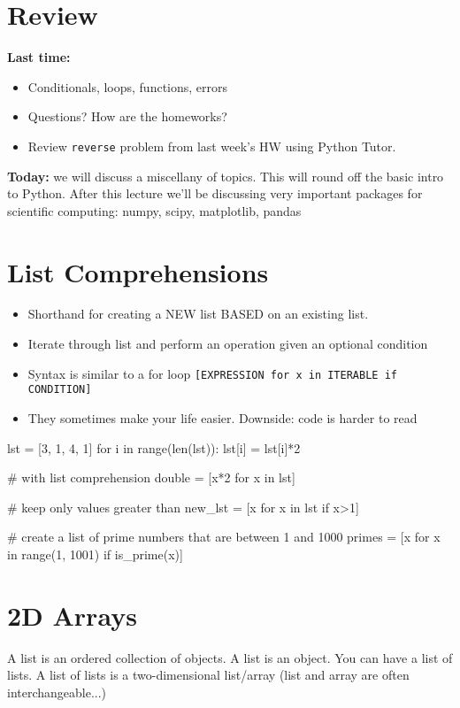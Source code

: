 \documentclass[12pt]{article}
\numberwithin{equation}{section}
\begin{document}
	

\section{Review}

\textbf{Last time:}
\begin{itemize}
    \item Conditionals, loops, functions, errors
    \item Questions? How are the homeworks?
    \item Review \verb|reverse| problem from last week's HW using Python Tutor.
\end{itemize}

\textbf{Today:} we will discuss a miscellany of topics. This will round off the basic intro to Python. After this lecture we'll be discussing very important packages for scientific computing: numpy, scipy, matplotlib, pandas

\section{List Comprehensions}
\begin{itemize}
    \item Shorthand for creating a NEW list BASED on an existing list.
    \item Iterate through list and perform an operation given an optional condition
    \item Syntax is similar to a for loop
    \verb|[EXPRESSION for x in ITERABLE if CONDITION]|
    \item They sometimes make your life easier. Downside: code is harder to read
\end{itemize}

\begin{python}
lst = [3, 1, 4, 1]
for i in range(len(lst)):
    lst[i] = lst[i]*2

# with list comprehension
double = [x*2 for x in lst]

# keep only values greater than 
new_lst = [x for x in lst if x>1]

# create a list of prime numbers that are between 1 and 1000
primes = [x for x in range(1, 1001) if is_prime(x)]
\end{python}

\section{2D Arrays}
A list is an ordered collection of objects. A list is an object. You can have a list of lists. A list of lists is a two-dimensional list/array (list and array are often interchangeable...)
\end{document}
